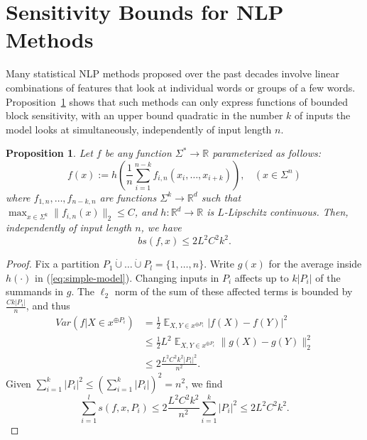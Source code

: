 \documentclass[11pt,a4paper]{article}
\newcommand{\E}{\mathop{\mathbb{E}}}%
\newcounter{theorem}
\newtheorem{proposition}[theorem]{Proposition}
\begin{document}
\section{Sensitivity Bounds for NLP Methods}\label{sec:bounds-models}


Many statistical NLP methods proposed over the past decades involve linear combinations of features that look at individual words or groups of a few words.
Proposition~\ref{prop:sensitivity-linear-model} shows that such methods can only express functions of bounded block sensitivity, with an upper bound quadratic in the number $k$ of inputs the model looks at simultaneously, independently of input length $n$.

\begin{proposition}\label{prop:sensitivity-linear-model}
Let $f$ be any function $\Sigma^* \rightarrow \mathbb{R}$ parameterized as follows:
	\begin{equation}\label{eq:simple-model}
f(x) := h\left(\frac{1}{n} \sum_{i=1}^{n-k} f_{i,n}(x_i, \dots, x_{i+k})\right),\ \ \ \ (x \in \Sigma^n)
\end{equation}
	where $f_{1,n}, \dots, f_{{n-k},n}$ are functions $\Sigma^k \rightarrow \mathbb{R}^d$ such that $\max_{x \in \Sigma^k} \|f_{i,n}(x)\|_2 \leq C$, and $h : \mathbb{R}^d \rightarrow \mathbb{R}$ is $L$-Lipschitz continuous.
Then, independently of input length $n$, we have
\begin{equation}
    bs(f,x) \leq 2L^2 C^2 k^2.
\end{equation}

\end{proposition}

\begin{proof}
Fix a partition $P_1 \dot\cup \dots \dot\cup P_l = \{1, \dots, n\}$.
Write $g(x)$ for the average inside $h(\cdot)$ in (\ref{eq:simple-model}).
	Changing inputs in $P_i$ affects up to $k |P_i|$ of the summands in $g$.
	The $\ell_2$ norm of the sum of these affected terms is bounded by $\frac{Ck |P_i|}{n}$, and thus
\begin{align*}
 Var(f|X \in x^{\oplus P_i}) &= \frac{1}{2} \E_{X, Y \in x^{\oplus P_i}} |f(X)-f(Y)|^2 \\
	&\leq \frac{1}{2} L^2 \E_{X, Y \in x^{\oplus P_i}} \|g(X)-g(Y)\|^2_2 \\
	& \leq 2 \frac{L^2C^2k^2 |P_i|^2}{n^2}.
\end{align*}
Given $\sum_{i=1}^k |P_i|^2 \leq (\sum_{i=1}^k |P_i|)^2 = n^2$, we find
	\begin{equation*}
	\sum_{i=1}^l s(f,x,P_i)   \leq 2 \frac{L^2C^2k^2}{n^2} \sum_{i=1}^k |P_i|^2 \leq 2L^2 C^2k^2.
\end{equation*}
\end{proof}
\end{document}
